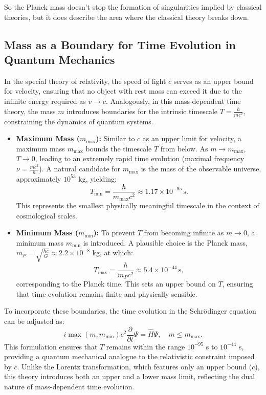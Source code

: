 \documentclass{article}
\begin{document}
	So the Planck mass doesn't stop the formation of singularities implied by classical theories, but it does describe the area where the classical theory breaks down.
	
	\subsection{Mass as a Boundary for Time Evolution in Quantum Mechanics}
	
	In the special theory of relativity, the speed of light $c$ serves as an upper bound for velocity, ensuring that no object with rest mass can exceed it due to the infinite energy required as $v \to c$. Analogously, in this mass-dependent time theory, the mass $m$ introduces boundaries for the intrinsic timescale $T = \frac{\hbar}{mc^2}$, constraining the dynamics of quantum systems.
	
	\begin{itemize}
		\item \textbf{Maximum Mass ($m_{\text{max}}$):} Similar to $c$ as an upper limit for velocity, a maximum mass $m_{\text{max}}$ bounds the timescale $T$ from below. As $m \to m_{\text{max}}$, $T \to 0$, leading to an extremely rapid time evolution (maximal frequency $\nu = \frac{mc^2}{h}$). A natural candidate for $m_{\text{max}}$ is the mass of the observable universe, approximately $10^{53}$ kg, yielding:
		\[
		T_{\text{min}} = \frac{\hbar}{m_{\text{max}} c^2} \approx 1.17 \times 10^{-95} \, \text{s}.
		\]
		This represents the smallest physically meaningful timescale in the context of cosmological scales.
		
		\item \textbf{Minimum Mass ($m_{\text{min}}$):} To prevent $T$ from becoming infinite as $m \to 0$, a minimum mass $m_{\text{min}}$ is introduced. A plausible choice is the Planck mass, $m_P = \sqrt{\frac{\hbar c}{G}} \approx 2.2 \times 10^{-8}$ kg, at which:
		\[
		T_{\text{max}} = \frac{\hbar}{m_P c^2} \approx 5.4 \times 10^{-44} \, \text{s},
		\]
		corresponding to the Planck time. This sets an upper bound on $T$, ensuring that time evolution remains finite and physically sensible.
	\end{itemize}
	
	To incorporate these boundaries, the time evolution in the Schrödinger equation can be adjusted as:
	\begin{equation}
		i \max(m, m_{\text{min}}) c^2 \frac{\partial}{\partial t} \Psi = \hat{H} \Psi, \quad m \leq m_{\text{max}}.
	\end{equation}
	This formulation ensures that $T$ remains within the range $10^{-95}$ s to $10^{-44}$ s, providing a quantum mechanical analogue to the relativistic constraint imposed by $c$. Unlike the Lorentz transformation, which features only an upper bound ($c$), this theory introduces both an upper and a lower mass limit, reflecting the dual nature of mass-dependent time evolution.
	\appendix
\end{document}
